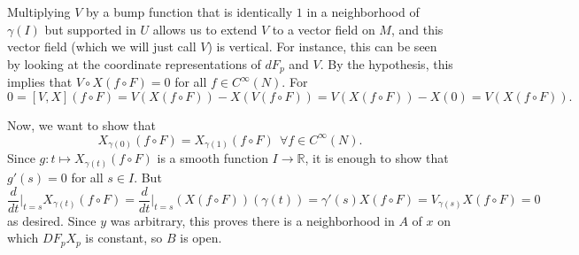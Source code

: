\documentclass[10pt,letter]{article}
\begin{document}
\begin{enumerate}[label=(\alph*)]
Multiplying $V$ by a bump function that is identically $1$ in a neighborhood of $\gamma(I)$ but supported in $U$ allows us to extend $V$ to a vector field on $M$, and this vector field (which we will just call $V$) is vertical. For instance, this can be seen by looking at the coordinate representations of $dF_p$ and $V$. By the hypothesis, this implies that $V \circ X(f \circ F) = 0$ for all $f \in C^{\infty}(N)$. For \[ 0 = [V,X](f \circ F) = V(X(f \circ F)) - X(V(f \circ F)) = V(X(f \circ F)) - X(0) = V(X(f \circ F)). \]

Now, we want to show that \[ X_{\gamma(0)}(f \circ F) = X_{\gamma(1)}(f \circ F) \ \  \forall f \in C^{\infty}(N). \] Since $g: t \mapsto X_{\gamma(t)}(f \circ F)$ is a smooth function $I \rightarrow \mathbb{R}$, it is enough to show that $g'(s) = 0$ for all $s \in I$. But \[ \frac{d}{dt}\bigg \vert_{t=s} X_{\gamma(t)}(f \circ F) =  \frac{d}{dt}\bigg \vert_{t=s} (X(f \circ F))(\gamma(t)) = \gamma'(s) X(f \circ F) = V_{\gamma(s)} X(f \circ F) = 0  \]
as desired. Since $y$ was arbitrary, this proves there is a neighborhood in $A$ of $x$ on which $DF_p X_p$ is constant, so $B$ is open.  

\end{enumerate}
\end{document}
